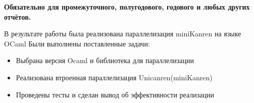 
\textbf{Обязательно для промежуточного, полугодового, годового и  любых других отчётов.}

В результате работы была реализована параллелизация miniKanren на языке OCaml
Были выполнены поставленные задачи:


\begin{itemize}
\item Выбрана версия Ocaml и библиотека для параллелизации
\item Реализована втроенная параллелизация Unicanren(miniKanren)
\item Проведены тесты и сделан вывод об эффективности реализации
\end{itemize}


